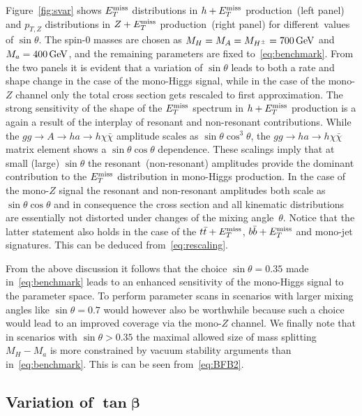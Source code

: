 Figure~\ref{fig:svar} shows $E_T^\mathrm{miss}$ distributions in $h + E_T^\mathrm{miss}$ production~(left panel) and $p_{T,Z}$ distributions in $Z+E_T^\mathrm{miss}$ production~(right panel) for different~values of $\sin \theta$. The spin-0 masses are chosen as $M_{H} = M_{A} = M_{H^{\pm}} = 700 \, {\rm GeV}$ and $M_{a} = 400 \, {\rm GeV}$, and the remaining parameters are fixed to~\eqref{eq:benchmark}. From the two panels it is evident that a variation of $\sin \theta$ leads to both a rate and shape change in the case of the mono-Higgs signal, while in the case of the mono-$Z$ channel only the total cross section gets rescaled to first approximation. The strong sensitivity of the shape of the $E_T^\mathrm{miss}$ spectrum in $h + E_T^\mathrm{miss}$ production is a again a result of the interplay of resonant and non-resonant contributions. While the $gg \to A \to h a \to h \chi \bar \chi$  amplitude scales as $\sin \theta \cos^3 \theta$, the $gg \to h a  \to h \chi \bar \chi$ matrix element shows a $\sin \theta \cos \theta$ dependence. These scalings imply that at small (large) $\sin \theta$ the resonant~(non-resonant) amplitudes provide the dominant contribution to the $E_T^\mathrm{miss}$ distribution in mono-Higgs production. In the case of the mono-$Z$ signal the resonant and non-resonant amplitudes both scale as $\sin \theta \cos \theta$ and in consequence the cross section and all kinematic distributions are essentially not distorted  under changes of the mixing angle~$\theta$. Notice that the latter statement also holds in the case of the $t \bar t +E_T^\mathrm{miss}$, $b \bar b + E_T^\mathrm{miss}$ and mono-jet signatures.  This can be deduced from~\eqref{eq:rescaling}. 

From the above discussion it follows that the choice $\sin \theta = 0.35$ made in~\eqref{eq:benchmark} leads to an enhanced sensitivity of the mono-Higgs signal to the \hdma parameter space. To perform parameter scans in scenarios with larger mixing angles like $\sin \theta = 0.7$ would however also be worthwhile because such a choice would lead to an improved coverage via the mono-$Z$ channel. We finally note that in scenarios with $\sin \theta >0.35$ the maximal allowed size of mass splitting $M_H - M_a$ is more constrained by vacuum stability arguments than in~\eqref{eq:benchmark}. This is can be seen from~\eqref{eq:BFB2}. 

\subsection*{Variation of $\bm{\tan \beta}$}

